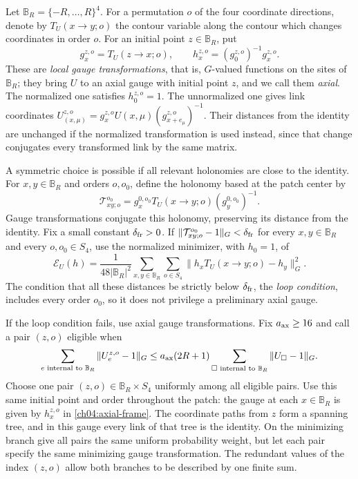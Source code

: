 Let $\mathbb B_R=\{-R,\ldots,R\}^4$. For a permutation $o$ of the four
coordinate directions, denote by $T_U(x\to y;o)$ the contour variable along the
contour which changes coordinates in order $o$. For an initial point $z\in\mathbb B_R$,
put
\begin{equation}
 g_x^{z,o}=T_U(z\to x;o),\qquad
 h_x^{z,o}=(g_0^{z,o})^{-1}g_x^{z,o}.
 \label{ch04:axial-frame}
\end{equation}
These are \emph{local gauge transformations}, that is, $G$-valued functions on the sites of $\mathbb B_R$; they bring $U$ to an axial gauge with initial point $z$, and we call them \emph{axial}. The normalized one satisfies $h_0^{z,o}=1$. The unnormalized one gives
link coordinates
$U_{(x,\mu)}^{z,o}=g_x^{z,o}U(x,\mu)(g_{x+e_\mu}^{z,o})^{-1}$.
Their distances from the identity are unchanged if the normalized transformation is used instead,
since that change conjugates every transformed link by the same matrix.

A symmetric choice is possible if all relevant holonomies are close to the identity.
For $x,y\in\mathbb B_R$ and orders $o,o_0$, define the holonomy based at the
patch center by
\[
 \mathcal T_{xy;o}^{o_0}
   =g_x^{0,o_0}T_U(x\to y;o)(g_y^{0,o_0})^{-1}.
\]
Gauge transformations conjugate this holonomy, preserving its distance from the identity. Fix a small constant $\delta_{\rm fr}>0$.
If $\|\mathcal T_{xy;o}^{o_0}-1\|_G<\delta_{\rm fr}$ for every
$x,y\in\mathbb B_R$ and every $o,o_0\in S_4$, use the
normalized minimizer, with $h_0=1$, of
\begin{equation}
 \mathcal E_U(h)=\frac1{48|\mathbb B_R|^2}
   \sum_{x,y\in\mathbb B_R}\sum_{o\in S_4}
       \bigl\|h_xT_U(x\to y;o)-h_y\bigr\|_G^2.
 \label{ch04:frame-energy}
\end{equation}
The condition that all these distances be strictly below $\delta_{\rm fr}$, the \emph{loop condition}, includes every order $o_0$, so it does not privilege a preliminary
axial gauge.

If the loop condition fails, use axial gauge transformations. Fix $a_{\rm ax}\ge16$ and call a pair
$(z,o)$ eligible when
\begin{equation}
 \sum_{e\text{ internal to }\mathbb B_R}\|U_e^{z,o}-1\|_G
 \le a_{\rm ax}(2R+1)
      \sum_{\square\text{ internal to }\mathbb B_R}\|U_\square-1\|_G.
 \label{ch04:axial-eligible}
\end{equation}
Choose one pair $(z,o)\in\mathbb B_R\times S_4$ uniformly among all
eligible pairs. Use this same initial point and order throughout the patch:
the gauge at each $x\in\mathbb B_R$ is given by $h_x^{z,o}$ in
\eqref{ch04:axial-frame}. The coordinate paths from $z$ form a spanning
tree, and in this gauge every link of that tree is the identity. On the minimizing branch give all
pairs the same uniform probability weight, but let each pair specify the same minimizing
gauge transformation. The redundant values of the index $(z,o)$ allow both branches to be described by one
finite sum.


